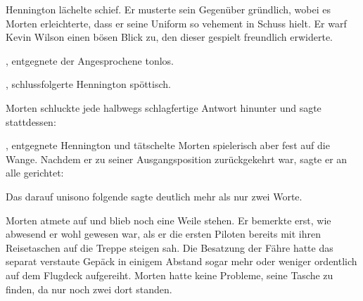 Hennington lächelte schief.  Er musterte sein Gegenüber gründlich, wobei es Morten erleichterte, dass er seine Uniform so vehement in Schuss hielt.  Er  warf Kevin Wilson einen bösen Blick zu, den dieser gespielt freundlich erwiderte. 

\par

, entgegnete der Angesprochene tonlos. 

\par

, schlussfolgerte Hennington spöttisch. 

\par

Morten schluckte jede halbwegs schlagfertige Antwort hinunter und sagte stattdessen: 

\par

, entgegnete Hennington und tätschelte Morten spielerisch aber fest auf die Wange. Nachdem er zu seiner Ausgangsposition zurückgekehrt war, sagte er an alle gerichtet: 

\par

Das darauf unisono folgende  sagte deutlich mehr als nur zwei Worte.

\par

Morten atmete auf und blieb noch eine Weile stehen. Er bemerkte erst, wie abwesend er wohl gewesen war, als er die ersten Piloten bereits mit ihren Reisetaschen auf die Treppe steigen sah. Die Besatzung der Fähre hatte das separat verstaute Gepäck in einigem Abstand sogar mehr oder weniger ordentlich auf dem Flugdeck aufgereiht. Morten hatte keine Probleme, seine Tasche zu finden, da nur noch zwei dort standen.

